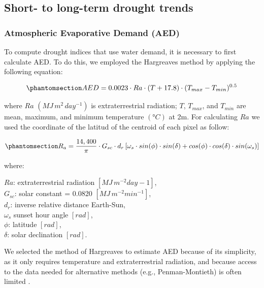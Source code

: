 \documentclass[
  sn-nature,
  numbered]{sn-jnl}
\begin{document}
\subsection{Short- to long-term drought
trends}\label{short--to-long-term-drought-trends}

\subsubsection{Atmospheric Evaporative Demand
(AED)}\label{atmospheric-evaporative-demand-aed}

To compute drought indices that use water demand, it is necessary to
first calculate AED. To do this, we employed the Hargreaves method
\citep{Hargreaves1994, Hargreaves1985} by applying the following
equation:

\begin{equation}\phantomsection\label{eq-AED}{AED = 0.0023\cdot Ra\cdot (T+17.8)\cdot (T_{max}-T_{min})^{0.5}}\end{equation}

where \(Ra\) \((MJ\,m^2\, day^{-1})\) is extraterrestrial radiation;
\(T\), \(T_{max}\), and \(T_{min}\) are mean, maximum, and minimum
temperature \((°C)\) at 2m. For calculating \(Ra\) we used the
coordinate of the latitud of the centroid of each pixel as follow:

\begin{equation}\phantomsection\label{eq-Ra}{R_a = \frac{14,400}{\pi}\cdot G_{sc}\cdot d_r \left[\omega_s\cdot sin(\phi)\cdot sin(\delta)+cos(\phi)\cdot cos(\delta)\cdot sin(\omega_s) \right]}\end{equation}

where:

\(Ra\): extraterrestrial radiation \([MJ\, m^{-2} day-1]\),\\
\(G_{sc}\): solar constant = 0.0820 \([MJ\,m^{-2} min^{-1}]\),\\
\(d_r\): inverse relative distance Earth-Sun,\\
\(\omega_s\) sunset hour angle \([rad]\),\\
\(\phi\): latitude \([rad]\),\\
\(\delta\): solar declination \([rad]\).

We selected the method of Hargreaves to estimate AED because of its
simplicity, as it only requires temperature and extraterrestrial
radiation, and because access to the data needed for alternative methods
(e.g., Penman-Montieth) is often limited \citep{Vicente-Serrano2014}.
\end{document}
